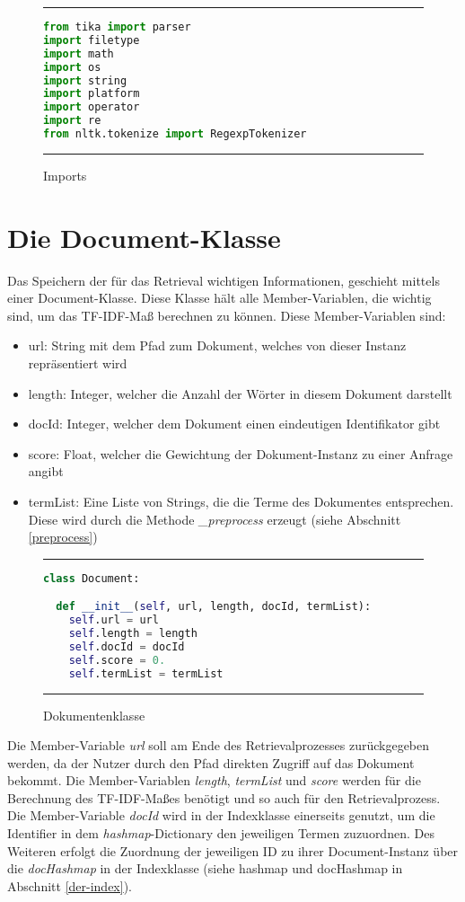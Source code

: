 \begin{figure}[h]
	\rule{\textwidth}{0.4pt}
		\begin{lstlisting}[language=Python]
from tika import parser
import filetype
import math
import os
import string
import platform
import operator
import re
from nltk.tokenize import RegexpTokenizer
		\end{lstlisting}
	\rule{\textwidth}{0.4pt}
	\caption{Imports}
	\label{fig:import}
\end{figure}

\section{Die Document-Klasse}\label{die-document-klasse}

Das Speichern der für das Retrieval wichtigen Informationen, geschieht mittels einer Document-Klasse. Diese Klasse hält alle Member-Variablen, die wichtig sind, um das TF-IDF-Maß berechnen zu können. Diese Member-Variablen sind:
\begin{itemize}
	\item url: String mit dem Pfad zum Dokument, welches von dieser Instanz repräsentiert wird
	\item length: Integer, welcher die Anzahl der Wörter in diesem Dokument darstellt
	\item docId: Integer, welcher dem Dokument einen eindeutigen Identifikator gibt
	\item score: Float, welcher die Gewichtung der Dokument-Instanz zu einer Anfrage angibt
	\item termList: Eine Liste von Strings, die die Terme des Dokumentes entsprechen. Diese wird durch die Methode \textit{\_preprocess} erzeugt (siehe Abschnitt \ref{preprocess})
\end{itemize} 

\begin{figure}[h]
	\rule{\textwidth}{0.4pt}
		\begin{lstlisting}[language=Python]
class Document:

  def __init__(self, url, length, docId, termList):
    self.url = url
    self.length = length
    self.docId = docId
    self.score = 0.
    self.termList = termList
		\end{lstlisting}
	\rule{\textwidth}{0.4pt}
	\caption{Dokumentenklasse}
	\label{fig:document}
\end{figure}

Die Member-Variable \textit{url} soll am Ende des Retrievalprozesses zurückgegeben werden, da der Nutzer durch den Pfad direkten Zugriff auf das Dokument bekommt. Die Member-Variablen \textit{length}, \textit{termList} und \textit{score} werden für die Berechnung des TF-IDF-Maßes benötigt und so auch für den Retrievalprozess. Die Member-Variable \textit{docId} wird in der Indexklasse einerseits genutzt, um die Identifier in dem \textit{hashmap}-Dictionary den jeweiligen Termen zuzuordnen. Des Weiteren erfolgt die Zuordnung der jeweiligen ID zu ihrer Document-Instanz über die \textit{docHashmap} in der Indexklasse (siehe hashmap und docHashmap in Abschnitt \ref{der-index}).

